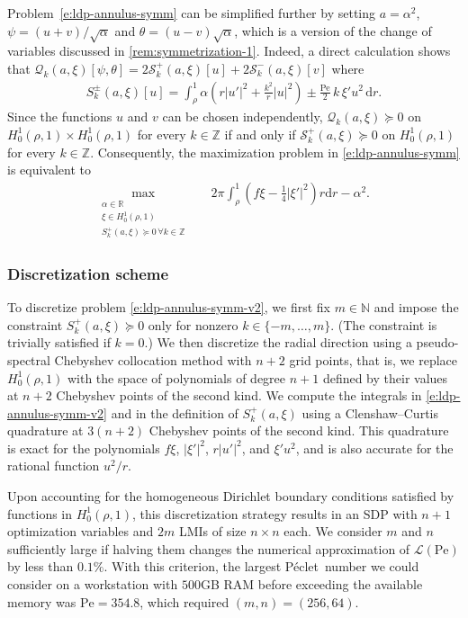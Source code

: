 \documentclass[a4paper, 10pt]{amsart}
\numberwithin{equation}{section}
\theoremstyle{plain}
\theoremstyle{definition}
\theoremstyle{remark}
\newcommand{\R}{\mathbb{R}}
\newcommand{\N}{\mathbb{N}}
\newcommand{\Z}{\mathbb{Z}}
\newcommand{\Pe}{\mathrm{Pe}}
\newcommand{\QF}{\mathcal{Q}}
\newcommand{\abs}[1]{\left\vert #1 \right\vert}
\newcommand{\dr}{\mathrm{d} r}
\newcommand{\lb}{\mathcal{L}}
\newcommand{\Peclet}{P\'eclet}
\begin{document}
Problem~\cref{e:ldp-annulus-symm} can be simplified further by setting $a=\alpha^2$, $\psi=(u+v)/\sqrt{\alpha}$ and $\theta = (u-v)\sqrt{\alpha}$, which is a version of the change of variables discussed in \cref{rem:symmetrization-1}. Indeed, a direct calculation shows that $\QF_k(a,\xi)[\psi,\theta] = 2\mathcal{S}_k^+(a,\xi)[u] + 2\mathcal{S}_k^-(a,\xi)[v]$ where
\begin{align*}
    S_k^\pm(a,\xi)[u] = \int_\rho^1 
        \alpha \left(r|u'|^2+ \frac{k^2}{r}|u|^2 \right)
        \pm \frac{\Pe}2 \,k\, \xi' u^2  \, \dr.
\end{align*}
Since the functions $u$ and $v$ can be chosen independently, $\QF_k(a,\xi) \succeq 0$ on $H^1_0(\rho,1) \times H^1_0(\rho,1)$ for every $k\in\Z$ if and only if $\mathcal{S}_k^+(a,\xi) \succeq 0$ on $H^1_0(\rho,1)$ for every $k\in\Z$. Consequently, the maximization problem in \cref{e:ldp-annulus-symm} is equivalent to
\begin{align}\label{e:ldp-annulus-symm-v2}
    \max_{\substack{\alpha \in \R \\ \xi \in H^1_0(\rho,1) \\ S_k^+(a,\xi) \succeq 0 \,\forall k \in \Z}}\quad
    &2\pi\int_\rho^1  \left( f\xi - \frac{1}{4} \abs{\xi'}^2 \right) r\dr - \alpha^2.
\end{align}


\subsubsection{Discretization scheme}
To discretize problem \cref{e:ldp-annulus-symm-v2}, we first fix $m\in\N$ and impose the constraint $S_k^+(a,\xi) \succeq 0$ only for nonzero $k \in \{-m,\ldots,m\}$. (The constraint is trivially satisfied if $k=0$.) We then discretize the radial direction using a pseudo-spectral Chebyshev collocation method with $n+2$ grid points, that is, we replace $H^1_0(\rho,1)$ with the space of polynomials of degree $n+1$ defined by their values at $n+2$ Chebyshev points of the second kind. We compute the integrals in \cref{e:ldp-annulus-symm-v2} and in the definition of $S_k^+(a,\xi)$ using a Clenshaw--Curtis quadrature at $3(n+2)$ Chebyshev points of the second kind. This quadrature is exact for the polynomials $f\xi$, $|\xi'|^2$, $r|u'|^2$, and $\xi'u^2$, and is also accurate for the rational function $u^2/r$. 

Upon accounting for the homogeneous Dirichlet boundary conditions satisfied by functions in $H^1_0(\rho,1)$, this discretization strategy results in an SDP with $n+1$ optimization variables and $2m$ LMIs of size $n\times n$ each. We consider $m$ and $n$ sufficiently large if halving them changes the numerical approximation of $\lb(\Pe)$ by less than $0.1\%$. With this criterion, the largest \Peclet\ number we could consider on a workstation with $500$GB RAM before exceeding the available memory was $\Pe = 354.8$, which required $(m,n)=(256,64)$.
\end{document}
